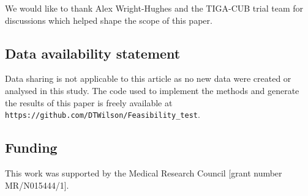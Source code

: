 \documentclass[AMA,STIX1COL]{WileyNJD-v2}
\begin{document}
We would like to thank Alex Wright-Hughes and the TIGA-CUB trial team for discussions which helped shape the scope of this paper.

\subsection*{Data availability statement}

Data sharing is not applicable to this article as no new data were created or analysed in this study. The code used to implement the methods and generate the results of this paper is freely available at \nolinkurl{https://github.com/DTWilson/Feasibility_test}.

\subsection*{Funding}

This work was supported by the Medical Research Council [grant number MR/N015444/1].

%


\appendix
\end{document}
